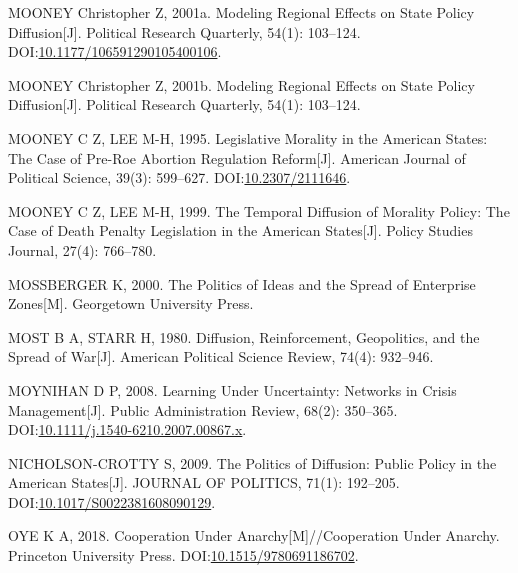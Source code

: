 \documentclass[
  12pt,
]{ctexart}
\newlength{\cslhangindent}
\newlength{\cslentryspacingunit} %
\newenvironment{CSLReferences}[2] %
 {%
  \setlength{\parindent}{0pt}
  \ifodd #1
  \let\oldpar\par
  \def\par{\hangindent=\cslhangindent\oldpar}
  \fi
  \setlength{\parskip}{#2\cslentryspacingunit}
 }%
 {}
\begin{document}
\begin{CSLReferences}{1}{0}
\leavevmode{}%
MOONEY Christopher Z, 2001a. Modeling {Regional Effects} on {State Policy Diffusion}{[}J{]}. Political Research Quarterly, 54(1): 103--124. DOI:\href{https://doi.org/10.1177/106591290105400106}{10.1177/106591290105400106}.

\leavevmode{}%
MOONEY Christopher Z, 2001b. Modeling Regional Effects on State Policy Diffusion{[}J{]}. Political Research Quarterly, 54(1): 103--124.

\leavevmode{}%
MOONEY C Z, LEE M-H, 1995. Legislative {Morality} in the {American States}: {The Case} of {Pre-Roe Abortion Regulation Reform}{[}J{]}. American Journal of Political Science, 39(3): 599--627. DOI:\href{https://doi.org/10.2307/2111646}{10.2307/2111646}.

\leavevmode{}%
MOONEY C Z, LEE M-H, 1999. The Temporal Diffusion of Morality Policy: {The} Case of Death Penalty Legislation in the {American} States{[}J{]}. Policy Studies Journal, 27(4): 766--780.

\leavevmode{}%
MOSSBERGER K, 2000. The {Politics} of {Ideas} and the {Spread} of {Enterprise Zones}{[}M{]}. {Georgetown University Press}.

\leavevmode{}%
MOST B A, STARR H, 1980. Diffusion, Reinforcement, Geopolitics, and the Spread of War{[}J{]}. American Political Science Review, 74(4): 932--946.

\leavevmode{}%
MOYNIHAN D P, 2008. Learning Under {Uncertainty}: {Networks} in {Crisis Management}{[}J{]}. Public Administration Review, 68(2): 350--365. DOI:\href{https://doi.org/10.1111/j.1540-6210.2007.00867.x}{10.1111/j.1540-6210.2007.00867.x}.

\leavevmode{}%
NICHOLSON-CROTTY S, 2009. The {Politics} of {Diffusion}: {Public Policy} in the {American States}{[}J{]}. JOURNAL OF POLITICS, 71(1): 192--205. DOI:\href{https://doi.org/10.1017/S0022381608090129}{10.1017/S0022381608090129}.

\leavevmode{}%
OYE K A, 2018. Cooperation Under {Anarchy}{[}M{]}//Cooperation Under Anarchy. {Princeton University Press}. DOI:\href{https://doi.org/10.1515/9780691186702}{10.1515/9780691186702}.


\end{CSLReferences}
\end{document}
